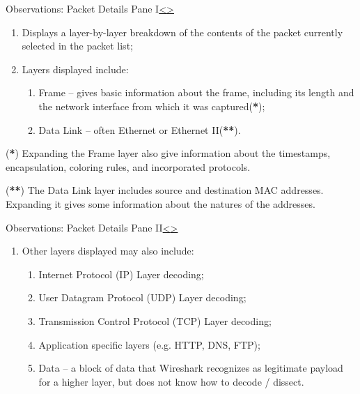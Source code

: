 \documentclass[12pt]{extarticle}
\newenvironment{instructionblock}{\Large\bgroup}{\egroup}
\newcommand{\ben}{\begin{enumerate}}
\newcommand{\een}{\end{enumerate}}
\begin{document}
	
	
	
	\pagebreak
	\begin{slide}{Observations: Packet Details Pane I}{\hyperref[slide 14]{\textless}\hyperref[slide 16]{\textgreater}}
		\begin{instructionblock}
			\begin{enumerate}
				\item Displays a layer-by-layer breakdown of the contents of the packet currently selected in the packet list;
				\item Layers displayed include:
				\ben
					\item Frame -- gives basic information about the frame, including its length and the network interface from which it was captured(\textbf{*});
					\item Data Link -- often Ethernet or Ethernet II(\textbf{**}).
				\een
			\end{enumerate}
		\end{instructionblock}
	\end{slide}
	
	\vspace{2mm}
	\noindent
	(\textbf{*}) Expanding the Frame layer also give information about the timestamps, encapsulation, coloring rules, and incorporated protocols.
	
	\vspace{2mm}
	\noindent
	(\textbf{**}) The Data Link layer includes source and destination MAC addresses.  Expanding it gives some information about the natures of the addresses.
	
	
	
	
	\pagebreak
	\begin{slide}{Observations: Packet Details Pane II}{\hyperref[slide 15]{\textless}\hyperref[slide 17]{\textgreater}}
		\begin{instructionblock}
			\begin{enumerate}
				\item Other layers displayed may also include:
				\ben
					\item Internet Protocol (IP) Layer decoding;
					\item User Datagram Protocol (UDP) Layer decoding;
					\item Transmission Control Protocol (TCP) Layer decoding;
					\item Application specific layers (e.g. HTTP, DNS, FTP);
					\item Data -- a block of data that Wireshark recognizes as legitimate payload for a higher layer, but does not know how to decode / dissect.
				\een
			\end{enumerate}
		\end{instructionblock}
	\end{slide}
	
\end{document}
